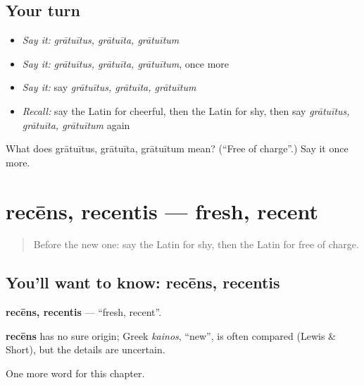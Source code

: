 \subsection*{Your turn}
\begin{itemize}
\raggedright
  \item \emph{Say it:} \emph{grātuītus, grātuīta, grātuītum}
  \item \emph{Say it:} \emph{grātuītus, grātuīta, grātuītum}, once more
  \item \emph{Say it:} say \emph{grātuītus, grātuīta, grātuītum}
  \item \emph{Recall:} say the Latin for cheerful, then the Latin for shy, then say \emph{grātuītus, grātuīta, grātuītum} again
\end{itemize}

\begin{tcolorbox}[breakable,colback=teal!4,colframe=teal!35!black,title={Before you move on}]
What does grātuītus, grātuīta, grātuītum mean? (\textquotedblleft{}Free of charge\textquotedblright{}.) Say it once more.
\end{tcolorbox}
\section[recēns, recentis]{recēns, recentis — fresh, recent}

\label{lesson:LA-C181-recens}



\begin{quote}
Before the new one: say the Latin for shy, then the Latin for free of charge.
\end{quote}

\subsection*{You'll want to know: recēns, recentis}
\textbf{recēns, recentis} — \textquotedblleft{}fresh, recent\textquotedblright{}.

\begin{cousinweb}
\textbf{recēns} has no sure origin; Greek \emph{kainos}, \textquotedblleft{}new\textquotedblright{}, is often compared (Lewis \& Short), but the details are uncertain.
\end{cousinweb}

\begin{grammarlens}[title={What you've built}]
One more word for this chapter.
\end{grammarlens}

